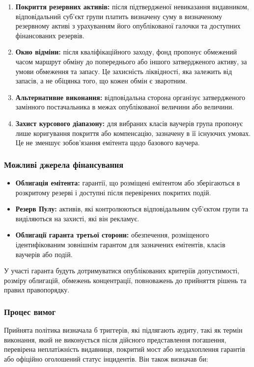 \documentclass[11pt]{article}
\begin{document}
\begin{enumerate}[leftmargin=*]
\item \textbf{Покриття резервних активів:} після підтвердженої невиказання видавником, відповідальний суб'єкт групи платить визначену суму в визначеному резервному активі з урахуванням його опублікованої галочки та доступних фінансованих резервів.
\item \textbf{Окно відміни:} після кваліфікаційного заходу, фонд пропонує обмежений часом маршрут обміну до попереднього або іншого затвердженого активу, за умови обмеження та запасу. Це захисність ліквідності, яка залежить від запасів, а не обіцянка того, що кожен обмін є зваротним.
\item \textbf{Альтернативне виконання:} відповідальна сторона організує затвердженого замінного постачальника в межах опублікованої величини або величини.
\item \textbf{Захист курсового діапазону:} для вибраних класів ваучерів група пропонує лише коригування покриття або компенсацію, зазначену в її існуючих умовах. Це не зменшує зобов'язання емітента щодо базового ваучера.
\end{enumerate}
\subsubsection*{Можливі джерела фінансування}

\begin{itemize}[leftmargin=*]
\item \textbf{Облигація емітента:} гарантії, що розміщені емітентом або зберігаються в розкритому резерві і доступні після перевірених покритих подій.
\item \textbf{Резерв Пулу:} активів, які контролюються відповідальним суб'єктом групи та виділяються на захисті, які він рекламує.
\item \textbf{Облигації гаранта третьої сторони:} обезпечення, розміщеного ідентифікованим зовнішнім гарантом для зазначених емітентів, класів ваучерів або подій.
\end{itemize}
У участі гаранта будуть дотримуватися опублікованих критеріїв допустимості, розміру облигацій, обмежень концентрації, повноважень до прийняття рішень та правил правопорядку.

\subsubsection*{Процес вимог}

Прийнята політика визначала б триггерів, які підлягають аудиту, такі як термін виконання, який не виконується після дійсного представлення погашення, перевірена неплатіжність видавниця, покритий мост або нездахоплення гарантів або офіційно оголошений статус інцидентів. Він також визначав би:
\end{document}
